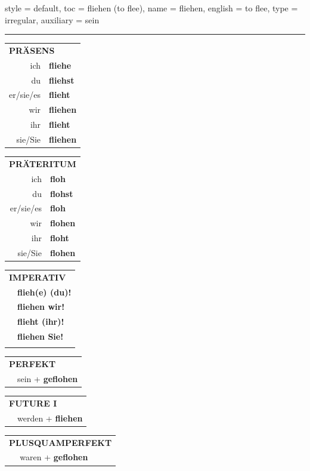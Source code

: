 \begin{verbentry}{
  style = {default},
  toc = {fliehen (to flee)},
  name = {fliehen},
  english = {to flee},
  type = {irregular},
  auxiliary = {sein}
}
 
    
     \vspace{5pt}

    \hrule
    
    \vspace{5pt}

  \begin{tabular}{rl}
     \multicolumn{2}{l}{\textbf{PRÄSENS} }\\
    ich & \textbf{fliehe}\\
    du & \textbf{fliehst}\\
    er/sie/es & \textbf{flieht}\\
    wir & \textbf{fliehen}\\
    ihr & \textbf{flieht}\\
    sie/Sie & \textbf{fliehen}\\
  \end{tabular}
  \hfill
     \begin{tabular}{rl}
    \multicolumn{2}{l}{\textbf{PRÄTERITUM} }\\
    ich & \textbf{floh}\\
    du & \textbf{flohst}\\
    er/sie/es & \textbf{floh}\\
    wir & \textbf{flohen}\\
    ihr & \textbf{floht}\\
    sie/Sie & \textbf{flohen}\\
  \end{tabular}
  \hfill
  \begin{tabular}{rl}
     \multicolumn{2}{l}{\textbf{IMPERATIV} }\\
   & \textbf{flieh(e) (du)!}\\
   & \textbf{fliehen wir!}\\
   & \textbf{flieht (ihr)!}\\
   & \textbf{fliehen Sie!}\\
   & \vspace{10pt}
  \end{tabular}

    \vspace{10pt}

 \begin{tabular}{rl}
     \multicolumn{2}{l}{\textbf{PERFEKT}}\\
   & sein + \textbf{geflohen}\\
  \end{tabular}
\hfill
   \begin{tabular}{rl}
    \multicolumn{2}{l}{\textbf{FUTURE I} }\\
   & werden + \textbf{fliehen}\\
  \end{tabular}
\hfill
   \begin{tabular}{rl}
      \multicolumn{2}{l}{\textbf{PLUSQUAMPERFEKT}}\\
   & waren + \textbf{geflohen}\\
  \end{tabular}


\end{verbentry}
